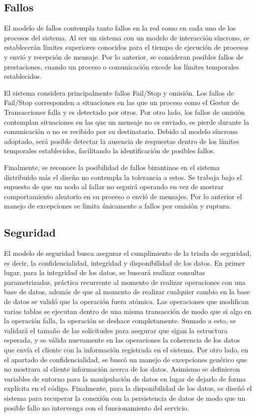 \documentclass[conference]{IEEEtran}
\begin{document}
\subsection{Fallos}

El modelo de fallos contempla tanto fallos en la red como en cada uno de los procesos del sistema. Al ser un sistema
con un modelo de interacción síncrono, se establecerán límites superiores conocidos para el tiempo de ejecución de procesos
y envió y recepción de mensaje. Por lo anterior, se consideran posibles fallos de prestaciones, 
cuando un proceso o comunicación excede los límites temporales establecidos. 

El sistema considera principalmente fallos Fail/Stop y omisión.
Los fallos de Fail/Stop corresponden a situaciones en las que un proceso como el Gestor de Transacciones falla y es detectado por otros.
Por otro lado, los fallos de omisión contemplan situaciones en las que un mensaje no es enviado, se pierde durante la
comunicación o no es recibido por su destinatario.
Debido al modelo síncrono adoptado, será posible detectar la ausencia de respuestas dentro de los límites temporales establecidos, 
facilitando la identificación de posibles fallos.

Finalmente, se reconoce la posibilidad de fallos bizantinos en el sistema distribuido más el diseño no contempla la tolerancia a estos.
Se trabaja bajo el supuesto de que un nodo al fallar no seguirá operando en vez de mostrar comportamiento aleatorio en su proceso o envió de mensajes.
Por lo anterior el manejo de excepciones se limita únicamente a fallos por omisión y ruptura.

\subsection{Seguridad}

El modelo de seguridad busca asegurar el cumplimiento de la triada de seguridad, es decir, la confidencialidad, integridad y disponibilidad de los datos.
En primer lugar, para la integridad de los datos, se buscará realizar consultas parametrizadas, práctica recurrente al momento de realizar operaciones con
una base de datos, además de que al momento de realizar cualquier cambio en la base de datos se validó que la operación fuera atómica.
Las operaciones que modifican varias tablas se ejecutan dentro de una misma transacción de modo que si algo en la operación falla, la operación se deshace completamente.
Sumado a esto, se validará el tamaño de las solicitudes para asegurar que sigan la estructura esperada, y se válida nuevamente en las operaciones la coherencia de los
datos que envía el cliente con la información registrada en el sistema. Por otro lado, en el apartado de confidencialidad, se buscó un manejo de excepciones genérico que
no mostrara al cliente información acerca de los datos. Asimismo se definieron variables de entorno para la manipulación de datos en lugar de dejarlo de forma explícita
en el código. Finalmente, para la disponibilidad de los datos, se diseñó el sistema para recuperar la conexión con la persistencia de datos de modo que un posible fallo no
intervenga con el funcionamiento del servicio.
\end{document}
